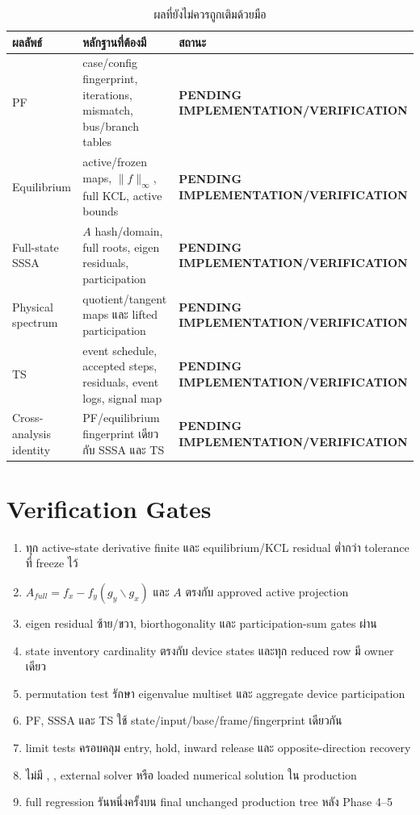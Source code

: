 \documentclass[12pt,a4paper]{article}
\newcommand{\code}[1]{\texttt{\detokenize{#1}}}
\newcommand{\pending}{\textcolor{red!75!black}{\textbf{PENDING IMPLEMENTATION/VERIFICATION}}}
\begin{document}
\begin{table}[H]\centering
\caption{ผลที่ยังไม่ควรถูกเติมด้วยมือ}
\begin{tabularx}{\textwidth}{p{}Xl}
\toprule
ผลลัพธ์ & หลักฐานที่ต้องมี & สถานะ \\\midrule
PF & case/config fingerprint, iterations, mismatch, bus/branch tables & \pending \\
Equilibrium & active/frozen maps, $\|f\|_\infty$, full KCL, active bounds & \pending \\
Full-state SSSA & $A$ hash/domain, full roots, eigen residuals, participation & \pending \\
Physical spectrum & quotient/tangent maps และ lifted participation & \pending \\
TS & event schedule, accepted steps, residuals, event logs, signal map & \pending \\
Cross-analysis identity & PF/equilibrium fingerprint เดียวกับ SSSA และ TS & \pending \\
\bottomrule
\end{tabularx}
\end{table}

\section{Verification Gates}

\begin{enumerate}
\item ทุก active-state derivative finite และ equilibrium/KCL residual ต่ำกว่า tolerance ที่ freeze ไว้
\item $A_{full}=f_x-f_y(g_y\backslash g_x)$ และ $A$ ตรงกับ approved active projection
\item eigen residual ซ้าย/ขวา, biorthogonality และ participation-sum gates ผ่าน
\item state inventory cardinality ตรงกับ device states และทุก reduced row มี owner เดียว
\item permutation test รักษา eigenvalue multiset และ aggregate device participation
\item PF, SSSA และ TS ใช้ state/input/base/frame/fingerprint เดียวกัน
\item limit tests ครอบคลุม entry, hold, inward release และ opposite-direction recovery
\item ไม่มี \code{inv}, \code{pinv}, external solver หรือ loaded numerical solution ใน production
\item full regression รันหนึ่งครั้งบน final unchanged production tree หลัง Phase 4--5
\end{enumerate}
\end{document}

